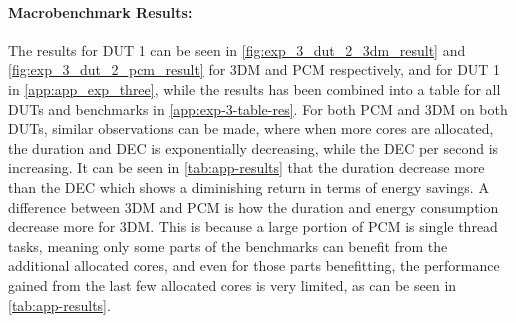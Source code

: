 


\paragraph*{Macrobenchmark Results:} The results for DUT 1 can be seen in \cref{fig:exp_3_dut_2_3dm_result} and \cref{fig:exp_3_dut_2_pcm_result} for 3DM and PCM respectively, and for DUT 1 in \cref{app:app_exp_three}, while the results has been combined into a table for all DUTs and benchmarks in \cref{app:exp-3-table-res}. For both PCM and 3DM on both DUTs, similar observations can be made, where when more cores are allocated, the duration and DEC is exponentially decreasing, while the DEC per second is increasing. It can be seen in \cref{tab:app-results} that the duration decrease more than the DEC which shows a diminishing return in terms of energy savings. A difference between 3DM and PCM is how the duration and energy consumption decrease more for 3DM. This is because a large portion of PCM is single thread tasks, meaning only some parts of the benchmarks can benefit from the additional allocated cores, and even for those parts benefitting, the performance gained from the last few allocated cores is very limited, as can be seen in \cref{tab:app-results}.


